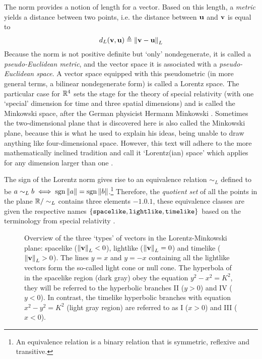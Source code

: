 The norm provides a notion of length for a vector. Based on this length, a \emph{metric} yields a distance between two points, i.e. the distance between \(\vb{u}\) and \(\vb{v}\) is equal to 
\[
     d_L(\vb{v}, \vb{u}) \triangleq \norm{\vb{v} - \vb{u}}_L
\] 
Because the norm is not positive definite but `only' nondegenerate, it is called a \emph{pseudo-Euclidean metric}, and the vector space it is associated with a \emph{pseudo-Euclidean space}. A vector space equipped with this pseudometric (in more general terms, a bilinear nondegenerate form) is called a Lorentz space. The particular case for \(\mathbb{R}^4\) sets the stage for the theory of special relativity (with one `special' dimension for time and three spatial dimensions) and is called the Minkowski space, after the German physicist Hermann Minkowski \cite{Catoni2008}. Sometimes the two-dimensional plane that is discovered here is also called the Minkowski plane, because this is what he used to explain his ideas, being unable to draw anything like four-dimensional space. However, this text will adhere to the more mathematically inclined tradition and call it `Lorentz(ian) space' which applies for any dimension larger than one \cite{Ratcliffe2019}. 

The sign of the Lorentz norm gives rise to an equivalence relation \(\sim_L\) defined to be \(a \sim_L b \iff \operatorname{sgn}{\norm{a}} = \operatorname{sgn}{\norm{b}}\).\footnote{An equivalence relation is a binary relation that is symmetric, reflexive and transitive.} Therefore, the \emph{quotient set} of all the points in the plane \(\mathbb{R} / \sim_L \) contains three elements \(\qty{-1, 0, 1}\), these equivalence classes are given the respective names \(\qty{\text{\texttt{spacelike}}, \text{\texttt{lightlike}}, \text{\texttt{timelike}}}\) based on the terminology from special relativity \cite{Landau1971}.

\begin{figure}[ht]
    \centering
    
    \caption{Overview of the three `types' of vectors in the Lorentz-Minkowski plane: spacelike (\(\norm{\vb{v}}_L < 0\)), lightlike (\(\norm{\vb{v}}_L = 0\)) and timelike (\(\norm{\vb{v}}_L > 0\)). The lines \(y = x\) and \(y = -x\) containing all the lightlike vectors form the so-called light cone or null cone. The hyperbola of in the spacelike region (dark gray) obey the equation \(y^2 - x^2 = K^2\), they will be referred to the hyperbolic branches II (\(y > 0\)) and IV (\(y < 0\)). In contrast, the timelike hyperbolic branches with equation \(x^2 - y^2 = K^2\) (light gray region) are referred to as I (\(x > 0\)) and III (\(x < 0\)).}
    \label{fig:lightlike_spacelike}
\end{figure}

